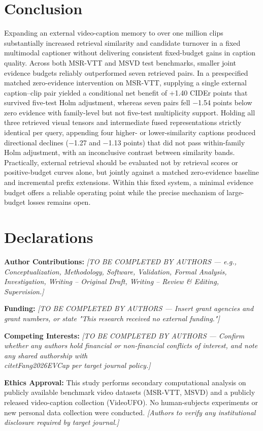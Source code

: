 \documentclass[11pt,a4paper]{article}
\begin{document}
\section{Conclusion}
Expanding an external video-caption memory to over one million clips substantially increased retrieval similarity and candidate turnover in a fixed multimodal captioner without delivering consistent fixed-budget gains in caption quality. Across both MSR-VTT and MSVD test benchmarks, smaller joint evidence budgets reliably outperformed seven retrieved pairs. In a prespecified matched zero-evidence intervention on MSR-VTT, supplying a single external caption--clip pair yielded a conditional net benefit of +1.40 CIDEr points that survived five-test Holm adjustment, whereas seven pairs fell $-$1.54 points below zero evidence with family-level but not five-test multiplicity support. Holding all three retrieved visual tensors and intermediate fused representations strictly identical per query, appending four higher- or lower-similarity captions produced directional declines ($-$1.27 and $-$1.13 points) that did not pass within-family Holm adjustment, with an inconclusive contrast between similarity bands. Practically, external retrieval should be evaluated not by retrieval scores or positive-budget curves alone, but jointly against a matched zero-evidence baseline and incremental prefix extensions. Within this fixed system, a minimal evidence budget offers a reliable operating point while the precise mechanism of large-budget losses remains open.

\section*{Declarations}
\textbf{Author Contributions:} \emph{[TO BE COMPLETED BY AUTHORS --- e.g., Conceptualization, Methodology, Software, Validation, Formal Analysis, Investigation, Writing -- Original Draft, Writing -- Review \& Editing, Supervision.]}

\textbf{Funding:} \emph{[TO BE COMPLETED BY AUTHORS --- Insert grant agencies and grant numbers, or state "This research received no external funding."]}

\textbf{Competing Interests:} \emph{[TO BE COMPLETED BY AUTHORS --- Confirm whether any authors hold financial or non-financial conflicts of interest, and note any shared authorship with \\citet{Fang2026EVCap} per target journal policy.]}

\textbf{Ethics Approval:} This study performs secondary computational analysis on publicly available benchmark video datasets (MSR-VTT, MSVD) and a publicly released video-caption collection (VideoUFO). No human-subjects experiments or new personal data collection were conducted. \emph{[Authors to verify any institutional disclosure required by target journal.]}
\end{document}
